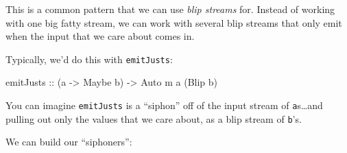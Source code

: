\documentclass[]{article}
\newenvironment{Shaded}{}{}
\newcommand{\CommentTok}[1]{\textcolor[rgb]{0.38,0.63,0.69}{\textit{#1}}}
\newcommand{\DataTypeTok}[1]{\textcolor[rgb]{0.56,0.13,0.00}{#1}}
\newcommand{\FunctionTok}[1]{\textcolor[rgb]{0.02,0.16,0.49}{#1}}
\newcommand{\NormalTok}[1]{#1}
\newcommand{\OtherTok}[1]{\textcolor[rgb]{0.00,0.44,0.13}{#1}}
\begin{document}
This is a common pattern that we can use \emph{blip streams} for. Instead of
working with one big fatty stream, we can work with several blip streams that
only emit when the input that we care about comes in.

Typically, we'd do this with \texttt{emitJusts}:

\begin{Shaded}
\begin{Highlighting}[]
\OtherTok{emitJusts ::}\NormalTok{ (a }\OtherTok{->} \DataTypeTok{Maybe}\NormalTok{ b) }\OtherTok{->} \DataTypeTok{Auto}\NormalTok{ m a (}\DataTypeTok{Blip}\NormalTok{ b)}
\end{Highlighting}
\end{Shaded}

You can imagine \texttt{emitJusts} is a ``siphon'' off of the input stream of
\texttt{a}s\ldots{}and pulling out only the values that we care about, as a blip
stream of \texttt{b}'s.

We can build our ``siphoners'':

\begin{Shaded}
\end{Shaded}
\end{document}
